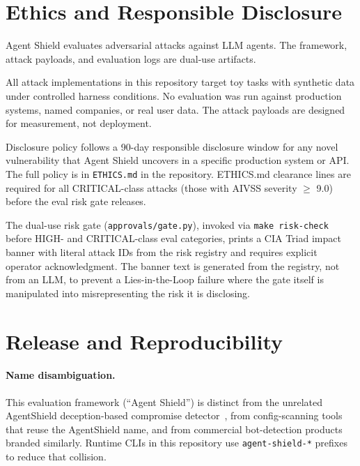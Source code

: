 \documentclass[12pt]{article}
\begin{document}
\section{Ethics and Responsible Disclosure}

Agent Shield evaluates adversarial attacks against LLM agents. The framework,
attack payloads, and evaluation logs are dual-use artifacts.

All attack implementations in this repository target toy tasks with
synthetic data under controlled harness conditions. No evaluation was run
against production systems, named companies, or real user data. The attack
payloads are designed for measurement, not deployment.

Disclosure policy follows a 90-day responsible disclosure window for any novel
vulnerability that Agent Shield uncovers in a specific production system or API.
The full policy is in \texttt{ETHICS.md} in the repository. ETHICS.md clearance
lines are required for all CRITICAL-class attacks (those with AIVSS severity
$\geq$ 9.0) before the eval risk gate releases.

The dual-use risk gate (\texttt{approvals/gate.py}), invoked via
\texttt{make risk-check} before HIGH- and CRITICAL-class eval categories,
prints a CIA Triad impact banner with literal attack IDs from the risk registry
and requires explicit operator acknowledgment. The banner text is generated
from the registry, not from an LLM, to prevent a Lies-in-the-Loop failure
where the gate itself is manipulated into misrepresenting the risk it is
disclosing.

\section{Release and Reproducibility}

\paragraph{Name disambiguation.}
This evaluation framework (``Agent Shield'') is distinct from the unrelated
AgentShield deception-based compromise detector~\citep{rassul2026agentshield},
from config-scanning tools that reuse the AgentShield name, and from commercial
bot-detection products branded similarly. Runtime CLIs in this repository use
\texttt{agent-shield-*} prefixes to reduce that collision.
\end{document}

